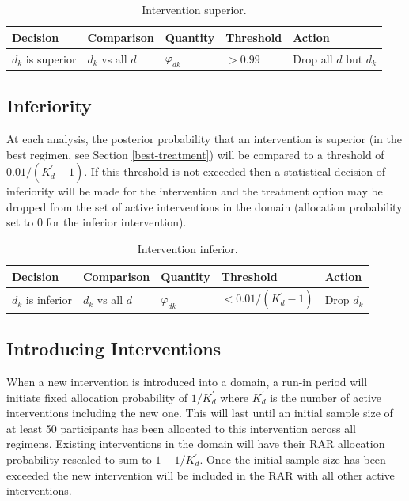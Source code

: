 \documentclass[
  11pt,
]{article}
\begin{document}
\begin{table}[H]

\caption{\label{tab:unnamed-chunk-4}Intervention superior.}
\centering
\begin{tabular}[t]{lllll}
\toprule
Decision & Comparison & Quantity & Threshold & Action\\
\midrule
$d_k$ is superior & $d_k$ vs all $d$ & $\varphi_{dk}$ & $>0.99$ & Drop all $d$ but $d_k$\\
\bottomrule
\end{tabular}
\end{table}

\hypertarget{inferiority}{%
\subsection{Inferiority}\label{inferiority}}

At each analysis, the posterior probability that an intervention is superior (in the best regimen, see Section \ref{best-treatment}) will be compared to a threshold of \(0.01/(K_d^\prime-1)\).
If this threshold is not exceeded then a statistical decision of inferiority will be made for the intervention and the treatment option may be dropped from the set of active interventions in the domain (allocation probability set to 0 for the inferior intervention).

\begin{table}[H]

\caption{\label{tab:unnamed-chunk-5}Intervention inferior.}
\centering
\begin{tabular}[t]{lllll}
\toprule
Decision & Comparison & Quantity & Threshold & Action\\
\midrule
$d_k$ is inferior & $d_k$ vs all $d$ & $\varphi_{dk}$ & $<0.01/(K_d^\prime-1)$ & Drop $d_k$\\
\bottomrule
\end{tabular}
\end{table}

\hypertarget{introducing-interventions}{%
\subsection{Introducing Interventions}\label{introducing-interventions}}

When a new intervention is introduced into a domain, a run-in period will initiate fixed allocation probability of \(1/K_d^\prime\) where \(K_d^\prime\) is the number of active interventions including the new one.
This will last until an initial sample size of at least 50 participants has been allocated to this intervention across all regimens.
Existing interventions in the domain will have their RAR allocation probability rescaled to sum to \(1 - 1/K_d^\prime\).
Once the initial sample size has been exceeded the new intervention will be included in the RAR with all other active interventions.
\end{document}
